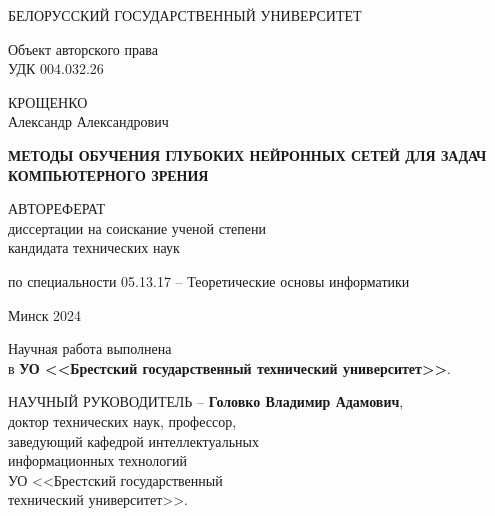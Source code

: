 \documentclass{thesisby}
\begin{document}
\thispagestyle{empty}
\fontsize{14}{16.5}\selectfont
\begin{center} 

\bfseries
\medskip

{БЕЛОРУССКИЙ ГОСУДАРСТВЕННЫЙ УНИВЕРСИТЕТ}


\vspace{2cm}
\end{center}

\noindent Объект авторского права\\
\noindent УДК 004.032.26 \\[5mm]

\begin{center}

{КРОЩЕНКО \\ Александр Александрович}\\

\vspace{1cm}

{\bfseries МЕТОДЫ ОБУЧЕНИЯ ГЛУБОКИХ НЕЙРОННЫХ СЕТЕЙ 
ДЛЯ ЗАДАЧ КОМПЬЮТЕРНОГО ЗРЕНИЯ}\\ \vspace{2cm}

АВТОРЕФЕРАТ\\ диссертации на соискание ученой степени\\
кандидата технических наук\\
\medskip



    
\vspace{1cm}
по специальности 05.13.17 -- Теоретические основы информатики 

\vspace*{\fill}


Минск 2024
\end{center}


\newpage

\thispagestyle{empty} 

\noindent Научная работа выполнена\\ в \textbf{УО <<Брестский государственный технический университет>>}.

\vspace{5mm}
\vspace*{\fill} 
\noindent \hangindent=53mm
    \begin{tabbing}
      НАУЧНЫЙ РУКОВОДИТЕЛЬ -- \={\bf Головко Владимир Адамович},\\ \>доктор технических наук, профессор,\\ \>заведующий кафедрой интеллектуальных\\ \>информационных технологий\\ \>УО <<Брестский государственный\\ \>технический университет>>.
    \end{tabbing}  
\end{document}
